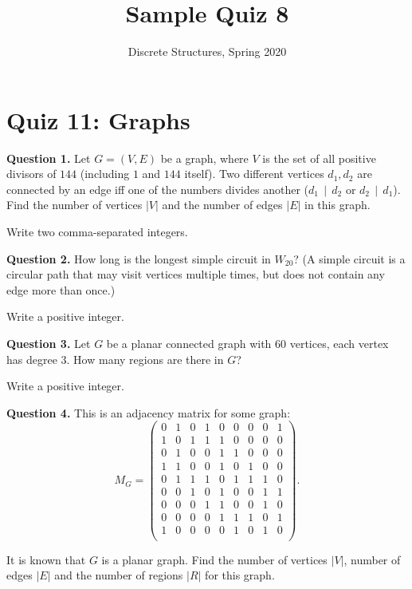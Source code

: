 \documentclass[jou]{apa6}
\title{Sample Quiz 8}
\author{Discrete Structures, Spring 2020}
\affiliation{RBS}
\begin{document}

\twocolumn
\section{Quiz 11: Graphs}

\vspace{4pt}
{\bf Question 1.}
Let $G = (V,E)$ be a graph, where $V$ is the set of all positive divisors of $144$ (including 
$1$ and $144$ itself). Two different vertices $d_1,d_2$ are connected by an edge iff one of the
numbers divides another ($d_1\,\mid\,d_2$ or $d_2\,\mid\,d_1$). 
Find the number of vertices $|V|$ and the number of edges $|E|$ in this graph.

Write two comma-separated integers.


\vspace{10pt}
{\bf Question 2.}
How long is the longest simple circuit in $W_{20}$? 
(A simple circuit is a circular path that may visit vertices multiple times, 
but does not contain any edge more than once.)

Write a positive integer. 




\vspace{10pt}
{\bf Question 3.}
Let $G$ be a planar connected graph with $60$ vertices, each vertex has degree $3$. 
How many regions are there in $G$?

Write a positive integer.



\vspace{10pt}
{\bf Question 4.} This is an adjacency matrix for some graph:
{\footnotesize
$$M_G = \left( 
\begin{array}{ccccccccc}
0 & 1 & 0 & 1 & 0 & 0 & 0 & 0 & 1 \\
1 & 0 & 1 & 1 & 1 & 0 & 0 & 0 & 0 \\
0 & 1 & 0 & 0 & 1 & 1 & 0 & 0 & 0 \\
1 & 1 & 0 & 0 & 1 & 0 & 1 & 0 & 0 \\
0 & 1 & 1 & 1 & 0 & 1 & 1 & 1 & 0 \\
0 & 0 & 1 & 0 & 1 & 0 & 0 & 1 & 1 \\
0 & 0 & 0 & 1 & 1 & 0 & 0 & 1 & 0 \\
0 & 0 & 0 & 0 & 1 & 1 & 1 & 0 & 1 \\
1 & 0 & 0 & 0 & 0 & 1 & 0 & 1 & 0 \\
\end{array} \right).$$
}

It is known that $G$ is a planar graph. Find the number of vertices $|V|$, 
number of edges $|E|$ and the number of regions $|R|$ for this graph. 
\end{document}
